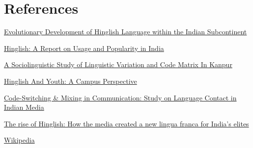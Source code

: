 \documentclass{article}
\begin{document}
\section{References}
\begin{enumerate}[label={[\arabic*]}]
    \item \href{https://www.researchgate.net/profile/Anusha-Salwathura/publication/346595689_EVOLUTIONARY_DEVELOPMENT_OF_'HINGLISH'_LANGUAGE_WITHIN_THE_INDIAN_SUB-CONTINENT/links/5fc8df9aa6fdcc697bd861a3/EVOLUTIONARY-DEVELOPMENT-OF-HINGLISH-LANGUAGE-WITHIN-THE-INDIAN-SUB-CONTINENT.pdf}{Evolutionary Development of Hinglish Language within the Indian Subcontinent}
    \item \href{https://www.milestoneloc.com/guide-to-hinglish-language/}{Hinglish: A Report on Usage and Popularity in India}
    \item \href{https://www.sciencedirect.com/science/article/pii/S1877042815034886?via\%3Dihub}{A Sociolinguistic Study of Linguistic Variation and Code Matrix In Kanpur}
    \item \href{https://www.termpaperwarehouse.com/essay-on/Hinglish-And-Youth-A-Campus-Perspective/346370}{Hinglish And Youth: A Campus Perspective}
    \item \href{https://www.readcube.com/articles/10.2139/ssrn.3085969}{Code-Switching \& Mixing in Communication: Study on Language Contact in Indian Media}
    \item \href{https://scroll.in/article/840341/the-rise-of-hinglish-how-the-media-created-a-new-lingua-franca-for-indias-elites}{The rise of Hinglish: How the media created a new lingua franca for India's elites}
    \item \href{https://en.wikipedia.org/wiki/Hinglish}{Wikipedia}
\end{enumerate}
\end{document}
